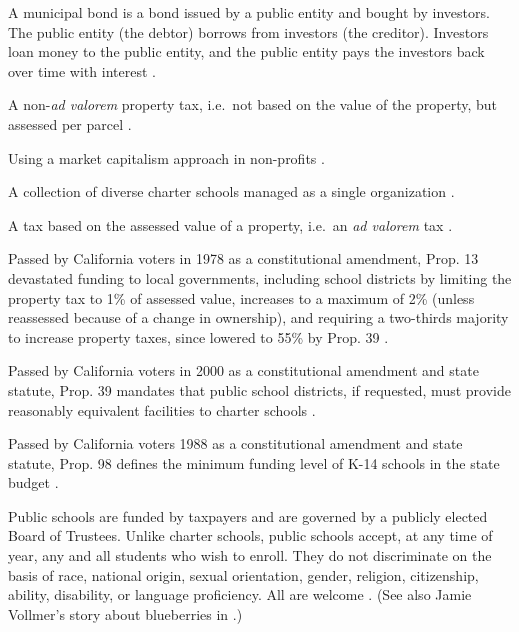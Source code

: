 \begin{description}[nosep]
\medskip\item[municipal bond] A municipal bond is a bond issued by a public entity and bought by investors. The public entity (the debtor) borrows from investors (the creditor). Investors loan money to the public entity, and the public entity pays the investors back over time with interest \parencite{Chen2022}.

\medskip\item[parcel tax] A non-\textit{ad valorem} property tax, i.e.~not based on the value of the property, but assessed per parcel \parencite{Lu2019}.

\medskip\item[philanthrocapitalism] Using a market capitalism approach in non-profits \parencite{Giridharadas2018}.

\medskip\item[portfolio school district] A collection of diverse charter schools managed as a single organization \parencite{Lake.Hernandez2011}.

\medskip\item[property tax] A tax based on the assessed value of a property, i.e.~an \textit{ad valorem} tax \parencite{BOE2018}.

\medskip\item[Proposition 13] Passed by California voters in 1978 as a constitutional amendment, Prop. 13 devastated funding to local governments, including school districts by limiting the property tax to 1\% of assessed value, increases to a maximum of 2\% (unless reassessed because of a change in ownership), and requiring a two-thirds majority to increase property taxes, since lowered to 55\% by Prop. 39 \parencite{Aguinaldo.etal2022a}.

\medskip\item[Proposition 39] Passed by California voters in 2000 as a constitutional amendment and state statute, Prop. 39 mandates that public school districts, if requested, must provide reasonably equivalent facilities to charter schools \parencite{Aguinaldo.etal2022a}.

\medskip\item[Proposition 98] Passed by California voters 1988 as a constitutional amendment and state statute, Prop. 98 defines the minimum funding level of K-14 schools in the state budget \parencite{Aguinaldo.etal2022a}.

\medskip\item[public school] Public schools are funded by taxpayers and are governed by a publicly elected Board of Trustees. Unlike charter schools, public schools accept, at any time of year, any and all students who wish to enroll. They do not discriminate on the basis of race, national origin, sexual orientation, gender, religion, citizenship, ability, disability, or language proficiency. All are welcome \parencite{CDE2023b}. (See also Jamie Vollmer's story about blueberries in \textcite{Vollmer2011}.)


\end{description}
